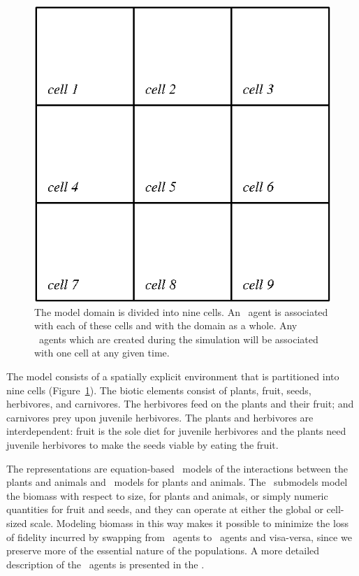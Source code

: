 \begin{figure}\label{domain}
\begin{center}
  \includegraphics{Figure2}
  \caption{The model domain is divided into nine cells. An \SD\ agent
    is associated with each of these cells and with the domain as a
    whole. Any \IB\ agents which are created during the simulation
    will be associated with one cell at any given time.}
\end{center}
\end{figure}


The model consists of a spatially explicit environment that is
partitioned into nine cells (Figure~\ref{domain}). The biotic elements
consist of plants, fruit, seeds, herbivores, and carnivores.  The
herbivores feed on the plants and their fruit; and carnivores prey
upon juvenile herbivores.  The plants and herbivores are
interdependent: fruit is the sole diet for juvenile herbivores and the
plants need juvenile herbivores to make the seeds viable by eating the
fruit.

The rep\-re\-sen\-ta\-tions are equation-based \SD\ models of the interactions
between the plants and animals and \IB\ models for plants and
animals. The \SD\ sub\-models model the biomass with respect
to size, for plants and animals, or simply numeric quantities for
fruit and seeds, and they can operate at either the global or
cell-sized scale. Modeling biomass in this way makes it possible to
minimize the loss of fidelity incurred by swapping from \IB\ agents to
\SD\ agents and visa-versa, since we preserve more of the essential
nature of the populations. A more detailed description of the
\SD\ agents is presented in the \SuppMaterial.

